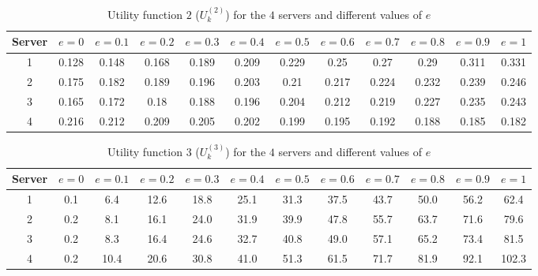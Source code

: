 \begin{table}[H]
    \caption{Utility function \(2\) (\(U_k^{(2)}\)) for the \(4\) servers and
    different values of \(e\)}
    \label{tab:case_study_utility_2_all_servers}
    \begin{adjustbox}{width=\columnwidth,center}
        \begin{tabular}{|c|c|c|c|c|c|c|c|c|c|c|c|}
            \hline
            Server & \(e = 0\) & \(e = 0.1\) & \(e = 0.2\) & \(e = 0.3\)
                   & \(e = 0.4\) & \(e = 0.5\) & \(e = 0.6\) & \(e = 0.7\)
                   & \(e = 0.8\) & \(e = 0.9\) & \(e = 1\) \\
            \hline
            1 & 0.128 & 0.148 & 0.168 & 0.189 & 0.209 & 0.229 & 0.25 & 0.27
            & 0.29 & 0.311 & 0.331 \\
            2 & 0.175 & 0.182 & 0.189 & 0.196 & 0.203 & 0.21 & 0.217 & 0.224
            & 0.232 & 0.239 & 0.246 \\
            3 & 0.165 & 0.172 & 0.18 & 0.188 & 0.196 & 0.204 & 0.212 & 0.219
            & 0.227 & 0.235 & 0.243 \\
            4 & 0.216 & 0.212 & 0.209 & 0.205 & 0.202 & 0.199 & 0.195 & 0.192
            & 0.188 & 0.185 & 0.182 \\
            \hline
        \end{tabular}
    \end{adjustbox}
\end{table}

\begin{table}[H]
    \caption{Utility function \(3\) (\(U_k^{(3)}\)) for the \(4\) servers and
    different values of \(e\)}
    \label{tab:case_study_utility_3_all_servers}
    \begin{adjustbox}{width=\columnwidth,center}
        \begin{tabular}{|c|c|c|c|c|c|c|c|c|c|c|c|}
            \hline
            Server & \(e = 0\) & \(e = 0.1\) & \(e = 0.2\) & \(e = 0.3\)
                   & \(e = 0.4\) & \(e = 0.5\) & \(e = 0.6\) & \(e = 0.7\)
                   & \(e = 0.8\) & \(e = 0.9\) & \(e = 1\) \\
            \hline
            1 & 0.1 & 6.4 & 12.6 & 18.8 & 25.1 & 31.3 & 37.5 & 43.7 & 50.0
            & 56.2 & 62.4 \\
            2 & 0.2 & 8.1 & 16.1 & 24.0 & 31.9 & 39.9 & 47.8 & 55.7 & 63.7
            & 71.6 & 79.6 \\
            3 & 0.2 & 8.3 & 16.4 & 24.6 & 32.7 & 40.8 & 49.0 & 57.1 & 65.2
            & 73.4 & 81.5 \\
            4 & 0.2 & 10.4 & 20.6 & 30.8 & 41.0 & 51.3 & 61.5 & 71.7 & 81.9
            & 92.1 & 102.3 \\
            \hline
        \end{tabular}
    \end{adjustbox}
\end{table}

